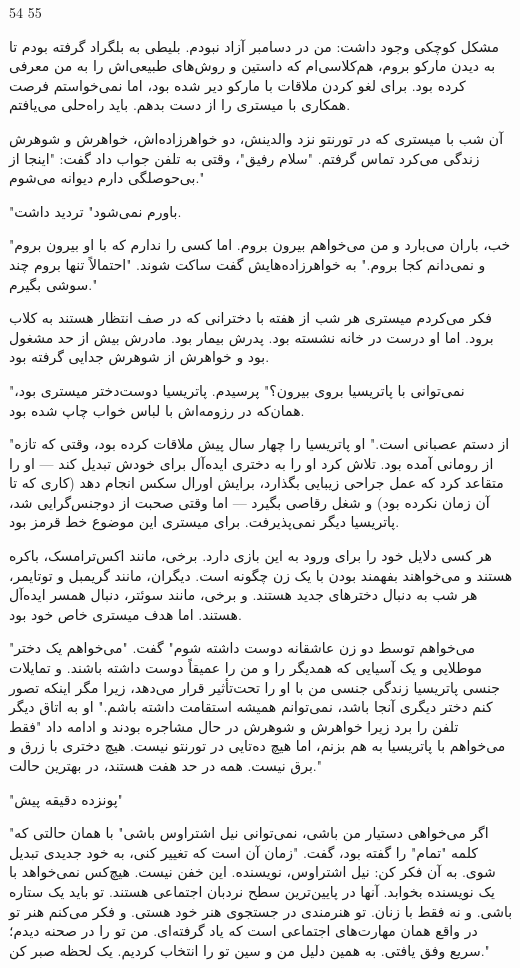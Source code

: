 54 55

مشکل کوچکی وجود داشت: من در دسامبر آزاد نبودم. بلیطی به بلگراد گرفته بودم تا به دیدن مارکو بروم، هم‌کلاسی‌ام که داستین و روش‌های طبیعی‌اش را به من معرفی کرده بود. برای لغو کردن ملاقات با مارکو دیر شده بود، اما نمی‌خواستم فرصت همکاری با میستری را از دست بدهم. باید راه‌حلی می‌یافتم.

آن شب با میستری که در تورنتو نزد والدینش، دو خواهرزاده‌اش، خواهرش و شوهرش زندگی می‌کرد تماس گرفتم. "سلام رفیق"، وقتی به تلفن جواب داد گفت: "اینجا از بی‌حوصلگی دارم دیوانه می‌شوم."

"باورم نمی‌شود" تردید داشت.

"خب، باران می‌بارد و من می‌خواهم بیرون بروم. اما کسی را ندارم که با او بیرون بروم و نمی‌دانم کجا بروم." به خواهرزاده‌هایش گفت ساکت شوند. "احتمالاً تنها بروم چند سوشی بگیرم."

فکر می‌کردم میستری هر شب از هفته با دخترانی که در صف انتظار هستند به کلاب برود. اما او درست در خانه نشسته بود. پدرش بیمار بود. مادرش بیش از حد مشغول بود و خواهرش از شوهرش جدایی گرفته بود.

"نمی‌توانی با پاتریسیا بروی بیرون؟" پرسیدم. پاتریسیا دوست‌دختر میستری بود، همان‌که در رزومه‌اش با لباس خواب چاپ شده بود.

"از دستم عصبانی است." او پاتریسیا را چهار سال پیش ملاقات کرده بود، وقتی که تازه از رومانی آمده بود. تلاش کرد او را به دختری ایده‌آل برای خودش تبدیل کند — او را متقاعد کرد که عمل جراحی زیبایی بگذارد، برایش اورال سکس انجام دهد (کاری که تا آن زمان نکرده بود) و شغل رقاصی بگیرد — اما وقتی صحبت از دوجنس‌گرایی شد، پاتریسیا دیگر نمی‌پذیرفت. برای میستری این موضوع خط قرمز بود.

هر کسی دلایل خود را برای ورود به این بازی دارد. برخی، مانند اکس‌ترامسک، باکره هستند و می‌خواهند بفهمند بودن با یک زن چگونه است. دیگران، مانند گریمبل و توتایمر، هر شب به دنبال دخترهای جدید هستند. و برخی، مانند سوئتر، دنبال همسر ایده‌آل هستند. اما هدف میستری خاص خود بود.

"می‌خواهم توسط دو زن عاشقانه دوست داشته شوم" گفت. "می‌خواهم یک دختر موطلایی و یک آسیایی که همدیگر را و من را عمیقاً دوست داشته باشند. و تمایلات جنسی پاتریسیا زندگی جنسی من با او را تحت‌تأثیر قرار می‌دهد، زیرا مگر اینکه تصور کنم دختر دیگری آنجا باشد، نمی‌توانم همیشه استقامت داشته باشم." او به اتاق دیگر تلفن را برد زیرا خواهرش و شوهرش در حال مشاجره بودند و ادامه داد "فقط می‌خواهم با پاتریسیا به هم بزنم، اما هیچ ده‌تایی در تورنتو نیست. هیچ دختری با زرق و برق نیست. همه در حد هفت هستند، در بهترین حالت."

"پونزده دقیقه پیش"

"اگر می‌خواهی دستیار من باشی، نمی‌توانی نیل اشتراوس باشی" با همان حالتی که کلمه "تمام" را گفته بود، گفت. "زمان آن است که تغییر کنی، به خود جدیدی تبدیل شوی. به آن فکر کن: نیل اشتراوس، نویسنده. این خفن نیست. هیچ‌کس نمی‌خواهد با یک نویسنده بخوابد. آنها در پایین‌ترین سطح نردبان اجتماعی هستند. تو باید یک ستاره باشی. و نه فقط با زنان. تو هنرمندی در جستجوی هنر خود هستی. و فکر می‌کنم هنر تو در واقع همان مهارت‌های اجتماعی است که یاد گرفته‌ای. من تو را در صحنه دیدم؛ سریع وفق یافتی. به همین دلیل من و سین تو را انتخاب کردیم. یک لحظه صبر کن."


